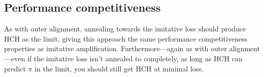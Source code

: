 \documentclass[
  onecolumn,
  natbib,
]{miri-tech-article}
\begin{document}
\subsection{Performance competitiveness} As with outer alignment, annealing towards the imitative loss should produce HCH as the limit, giving this approach the same performance competitiveness properties as imitative amplification. Furthermore---again as with outer alignment---even if the imitative loss isn't annealed to completely, as long as HCH can predict $\pi$ in the limit, you should still get HCH at minimal loss.


\end{document}
